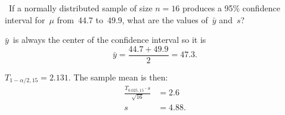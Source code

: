 \begin{problem}
  ~If a normally distributed sample of size ${n = 16}$ produces a 95\% confidence interval for~$\mu$ from~44.7 to~49.9, what are the values of~$\bar{y}$ and~$s$?
\end{problem}

$\bar{y}$~is always the center of the confidence interval so it is
\begin{equation}
  \bar{y} = \frac{44.7 + 49.9}{2} = \boxed{47.3}\text{.}
\end{equation}

${T_{1-\alpha/2,15} = 2.131}$.  The sample mean is then:
\begin{align}
  \frac{T_{0.025,15} \cdot s}{\sqrt{16}} &= 2.6 \\
  s &= \boxed{4.88} \text{.}
\end{align}

